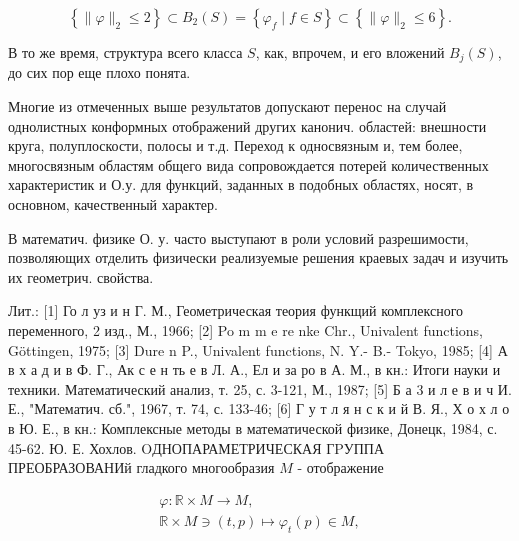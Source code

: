 \documentclass[10pt]{article}
\begin{document}
\[

\left\{\|\varphi\|_{2} \leqslant 2\right\} \subset B_{2}(S)=\left\{\varphi_{f} \mid f \in S\right\} \subset\left\{\|\varphi\|_{2} \leqslant 6\right\} .

\]



В то же время, структура всего класса $S$, как, впрочем, и его вложений $B_{j}(S)$, до сих пор еще плохо понята.



Многие из отмеченных выше результатов допускают перенос на случай однолистных конформных отображений других канонич. областей: внешности круга, полуплоскости, полосы и т.д. Переход к односвязным и, тем более, многосвязным областям общего вида сопровождается потерей количественных характеристик и О.у. для функций, заданных в подобных областях, носят, в основном, качественный характер.



В математич. физике О. у. часто выступают в роли условий разрешимости, позволяющих отделить физически реализуемые решения краевых задач и изучить их геометрич. свойства.



Лит.: [1] Го л уз и н Г. М., Геометрическая теория функщий комплексного переменного, 2 изд., М., 1966; [2] Po m m e re nke Chr., Univalent functions, Göttingen, 1975; [3] Dure n P., Univalent functions, N. Y.- B.- Tokyo, 1985; [4] А в х а д и в Ф. Г., Ак с е н ть е в Л. А., Ел и за ро в А. М., в кн.: Итоги науки и техники. Математический анализ, т. 25, с. 3-121, М., 1987; [5] Б а 3 и л е в и ч И. Е., "Математич. сб.", 1967, т. 74, с. 133-46; [6] Г у т л я н с к и й В. Я., Х о х л о в Ю. Е., в кн.: Комплексные методы в математической физике, Донецк, 1984, с. 45-62. Ю. Е. Хохлов. OДНОПАРАМЕТРИЧЕСКАЯ ГPУППА ПРЕОБРАЗОВАНИй гладкого многообразия $M$ - отображение



\[

\begin{gathered}

\varphi: \mathbb{R} \times M \rightarrow M, \\

\mathbb{R} \times M \ni(t, p) \mapsto \varphi_{t}(p) \in M,

\end{gathered}

\]
\end{document}
